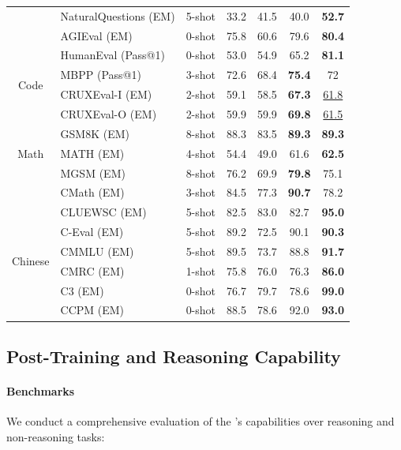 \begin{table}[!h]
\begin{tabular}{@{}c l c | c c c | c@{}}
    & NaturalQuestions {\tiny (EM)} & 5-shot & 33.2 & 41.5 & 40.0 & \textbf{52.7} \\
    & AGIEval {\tiny (EM)} & 0-shot & 75.8 & 60.6 & 79.6 & \textbf{80.4} \\
    \midrule
    \multirow{4}{*}{Code} & HumanEval {\tiny (Pass@1)} & 0-shot & 53.0 & 54.9 & 65.2 & \textbf{81.1} \\
    & MBPP {\tiny (Pass@1)} & 3-shot & 72.6 & 68.4 & \textbf{75.4} & 72  \\
    & CRUXEval-I {\tiny (EM)} & 2-shot & 59.1 & 58.5 & \textbf{67.3} & \underline{61.8}  \\
    & CRUXEval-O {\tiny (EM)} & 2-shot & 59.9 & 59.9 & \textbf{69.8} & \underline{61.5}  \\
    \midrule
    \multirow{3}{*}{Math} 
    & GSM8K {\tiny (EM)} & 8-shot & 88.3 & 83.5 & \textbf{89.3} & \textbf{89.3}  \\
    & MATH {\tiny (EM)} & 4-shot & 54.4 & 49.0 & 61.6 & \textbf{62.5}  \\
    & MGSM {\tiny (EM)} & 8-shot & 76.2 & 69.9 & \textbf{79.8} & 75.1  \\
    & CMath {\tiny (EM)} & 3-shot & 84.5 & 77.3 & \textbf{90.7} & 78.2  \\
    \midrule
    \multirow{7}{*}{Chinese} & CLUEWSC {\tiny (EM)} & 5-shot & 82.5 & 83.0 & 82.7 & \textbf{95.0} \\
    & C-Eval {\tiny (EM)} & 5-shot & 89.2 & 72.5 & 90.1 & \textbf{90.3}  \\
    & CMMLU {\tiny (EM)} & 5-shot & 89.5 & 73.7 & 88.8 & \textbf{91.7} \\
    & CMRC {\tiny (EM)} & 1-shot & 75.8 & 76.0 & 76.3 & \textbf{86.0}  \\
    & C3 {\tiny (EM)} & 0-shot & 76.7 & 79.7 & 78.6 & \textbf{99.0} \\
    & CCPM {\tiny (EM)} & 0-shot & 88.5 & 78.6 & 92.0 & \textbf{93.0}  \\
    \bottomrule
    \end{tabular}
    \label{tab:main}
\end{table}


\subsection{Post-Training and Reasoning Capability}
\paragraph{Benchmarks} We conduct a comprehensive evaluation of the \modelname's capabilities over reasoning and non-reasoning tasks:

